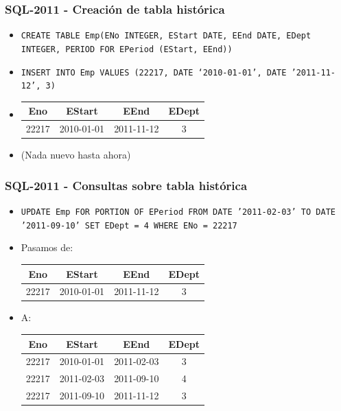 \begin{frame}
\frametitle{SQL-2011 - Creación de tabla histórica}
\begin{center}
\small
	\begin{itemize}

	\item	\texttt{CREATE TABLE Emp(ENo INTEGER, EStart DATE, EEnd DATE,
		EDept INTEGER, PERIOD FOR EPeriod (EStart, EEnd))} \\
	\pause

	\item	\texttt{INSERT INTO Emp VALUES (22217, DATE ‘2010-01-01’,
		DATE '2011-11-12', 3)} \\

	\pause

	\item \begin{tabular}{|c|c|c|c|}
	\hline
	Eno	& EStart	& EEnd		& EDept	\\ \hline
	22217	& 2010-01-01	& 2011-11-12	& 3	\\ \hline
	\end{tabular}

	\pause

	\item	(Nada nuevo hasta ahora)
	\end{itemize}
\end{center}
\end{frame}

\begin{frame}
\frametitle{SQL-2011 - Consultas sobre tabla histórica}
\begin{center}
\small
	\begin{itemize}

	\item	\texttt{UPDATE Emp FOR PORTION OF EPeriod FROM DATE '2011-02-03'
		TO DATE '2011-09-10' SET EDept = 4 WHERE ENo = 22217}
	\pause

	\item Pasamos de: \hfill \begin{tabular}{|c|c|c|c|}
	\hline
	Eno	& EStart	& EEnd		& EDept	\\ \hline
	22217	& 2010-01-01	& 2011-11-12	& 3	\\ \hline
	\end{tabular}
	\pause

	\item A: \hfill \begin{tabular}{|c|c|c|c|}
	\hline
	Eno	& EStart	& EEnd		& EDept	\\ \hline
	22217	& 2010-01-01	& 2011-02-03	& 3	\\ \hline
	22217	& 2011-02-03	& 2011-09-10	& 4	\\ \hline
	22217	& 2011-09-10	& 2011-11-12	& 3	\\ \hline
	\end{tabular}

	\end{itemize}
\end{center}
\end{frame}

